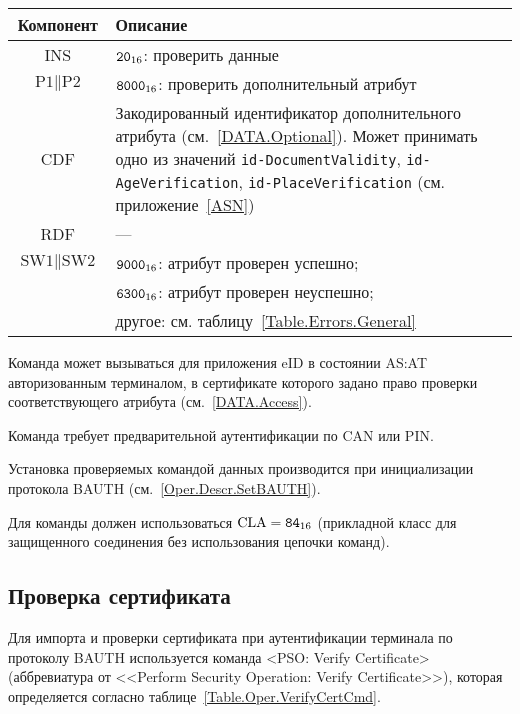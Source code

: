 \begin{table}[hbt]
\caption{}\label{Table.Oper.VerifyDataCmd}
\begin{tabular}{|c|p{14cm}|}
\hline
Компонент & Описание \\
\hline
\hline
INS & $\texttt{20}_{16}$: проверить данные\\
\hline
$\text{P1} \parallel \text{P2}$ & $\texttt{8000}_{16}$: 
проверить дополнительный атрибут\\
\hline
CDF & Закодированный идентификатор дополнительного атрибута 
(см.~\ref{DATA.Optional}). 
Может принимать одно из значений 
\verb|id-DocumentValidity|, \verb|id-AgeVerification|, \verb|id-PlaceVerification| 
(см. приложение~\ref{ASN})\\
\hline 
RDF &  --- \\
\hline
$\text{SW1} \parallel \text{SW2}$ & $\texttt{9000}_{16}$: атрибут проверен успешно;\\
 & $\texttt{6300}_{16}$: атрибут проверен неуспешно;\\
 & другое: см. таблицу~\ref{Table.Errors.General} \\
\hline
\end{tabular}
\end{table}

Команда может вызываться для приложения eID в состоянии AS:AT
авторизованным терминалом, в сертификате которого задано право
проверки соответствующего атрибута (см.~\ref{DATA.Access}).  

Команда требует предварительной аутентификации по CAN или PIN.

Установка проверяемых командой данных производится 
при инициализации протокола BAUTH (см.~\ref{Oper.Descr.SetBAUTH}).  

Для команды должен использоваться $\text{CLA}=\texttt{84}_{16}$ 
(прикладной класс для защищенного соединения без использования цепочки 
команд). 




\subsection{Проверка сертификата}
\label{Oper.Descr.VerifyCert}

Для импорта и проверки сертификата при аутентификации терминала 
по протоколу BAUTH используется команда 
<PSO: Verify Certificate> (аббревиатура от <<Perform Security 
Operation: Verify Certificate>>),
которая определяется согласно таблице~\ref{Table.Oper.VerifyCertCmd}.


